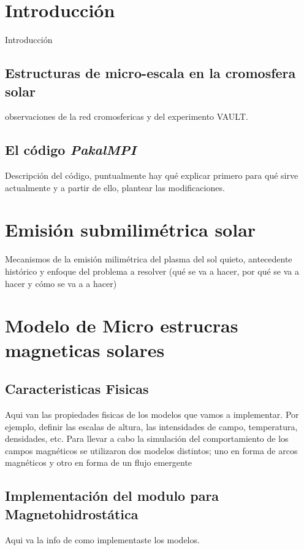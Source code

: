\documentclass[9pt]{book}
\begin{document}
  \renewcommand{\thepage}{\arabic{page}}
  \setcounter{page}{1}
  \renewcommand{\tablename}{Tabla}

 \chapter{Introducci\'on}
Introducci\'on
\section{Estructuras de micro-escala en la cromosfera solar}
observaciones de la red cromosfericas y del experimento VAULT.
\section{El c\'odigo \emph{PakalMPI}}
Descripci\'on del c\'odigo, puntualmente hay qu\'e explicar primero para qu\'e sirve actualmente y a partir de ello, plantear las modificaciones.


\chapter{Emisi\'on submilim\'etrica solar}
Mecanismos de la emisi\'on milim\'etrica del plasma del sol quieto, antecedente hist\'orico y enfoque del problema a resolver (qu\'e se va a hacer, por qu\'e se va a hacer y c\'omo se va a a hacer)
  
\chapter{Modelo de Micro estrucras magneticas solares}
\section{Caracteristicas Fisicas}
Aqui van las propiedades fisicas de los modelos que vamos a implementar. Por ejemplo, definir las escalas de altura, las intensidades de campo, temperatura, densidades, etc.
Para llevar a cabo la simulaci\'on del comportamiento de los campos magn\'eticos se utilizaron dos modelos distintos; uno en forma de arcos magn\'eticos \cite{loops} y otro en forma de un flujo emergente \cite{flujoemergente}

\section{Implementaci\'on del modulo para Magnetohidrost\'atica}
Aqui va la info de como implementaste los modelos.
\end{document}
